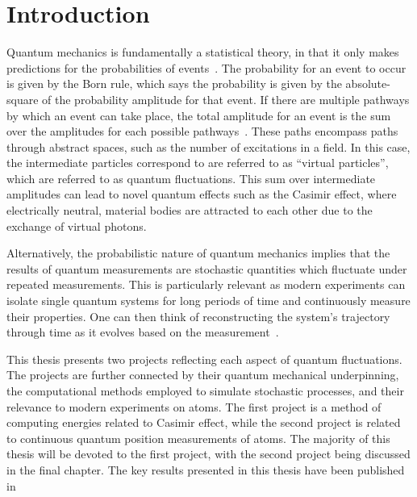 \chapter{Introduction}
\label{ch:introduction}
Quantum mechanics is fundamentally a statistical theory, in that it only makes predictions for 
the probabilities of events~\cite{Sakurai1994}.
The probability for an event to occur is given by the Born rule, which says the probability is given by 
the absolute-square of the probability amplitude for that event.  
If there are multiple pathways by which an event can take place, the total amplitude for an event is 
the sum over the amplitudes for each possible pathways~\cite{Feynman1965}.  
These paths encompass paths through abstract spaces, such as the number of excitations in a field.
In this case, the intermediate particles correspond to are referred to as ``virtual particles'', 
which are referred to as quantum fluctuations.
This sum over intermediate amplitudes can lead to novel quantum effects such as the Casimir effect,
where electrically neutral, material bodies are attracted to each other due to the exchange of virtual photons.

Alternatively, the probabilistic nature of quantum mechanics implies that the results of quantum measurements 
are stochastic quantities which fluctuate under repeated measurements.  
This is particularly relevant as modern experiments can isolate single quantum systems for long 
periods of time and continuously measure their properties.  One can then think of reconstructing
the system's trajectory through time as it evolves based on the measurement~\cite{Carmichael1993}.  

This thesis presents two projects reflecting each aspect of quantum fluctuations.  
The projects are further connected by their quantum mechanical underpinning, the computational methods 
employed to simulate stochastic processes, and their relevance to modern experiments on atoms.  
The first project is a method of computing energies related to Casimir effect, while the second project is related to 
continuous quantum position measurements of atoms.  The majority of this thesis will be devoted
to the first project, with the second project being discussed in the final chapter.  
The key results presented in this thesis have been published in~\cite{
Mackrory2010, Mackrory2016,Mackrory2017a, Mackrory2017b}

